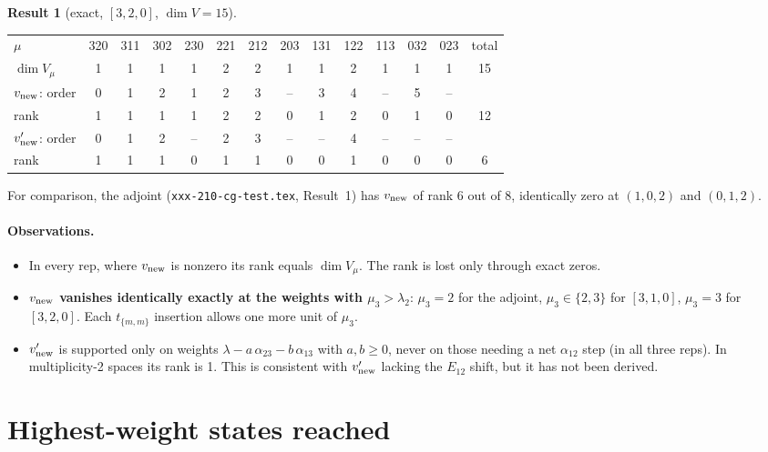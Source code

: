 \documentclass[11pt]{article}
\newcommand{\nb}[1]{\texttt{#1}}
\theoremstyle{definition}
\newtheorem{result}{Result}
\theoremstyle{remark}
\begin{document}
\begin{result}[{exact, $[3,2,0]$, $\dim V=15$}]\label{res:w320}
\begin{center}
\begin{tabular}{lccccccccccccc}\toprule
$\mu$ & 320 & 311 & 302 & 230 & 221 & 212 & 203 & 131 & 122 & 113 & 032 & 023 & total\\
$\dim V_\mu$ & 1 & 1 & 1 & 1 & 2 & 2 & 1 & 1 & 2 & 1 & 1 & 1 & 15\\\midrule
$v_{\rm new}$: order & 0 & 1 & 2 & 1 & 2 & 3 & -- & 3 & 4 & -- & 5 & -- & \\
\phantom{$v_{\rm new}$:} rank & 1 & 1 & 1 & 1 & 2 & 2 & 0 & 1 & 2 & 0 & 1 & 0 & 12\\\midrule
$v'_{\rm new}$: order & 0 & 1 & 2 & -- & 2 & 3 & -- & -- & 4 & -- & -- & -- & \\
\phantom{$v'_{\rm new}$:} rank & 1 & 1 & 1 & 0 & 1 & 1 & 0 & 0 & 1 & 0 & 0 & 0 & 6\\\bottomrule
\end{tabular}
\end{center}
\end{result}

For comparison, the adjoint (\nb{xxx-210-cg-test.tex}, Result~1) has $v_{\rm new}$ of rank 6 out of 8, identically zero at $(1,0,2)$ and $(0,1,2)$.

\paragraph{Observations.}
\begin{itemize}
\item In every rep, where $v_{\rm new}$ is nonzero its rank equals $\dim V_\mu$. The rank is lost only through exact zeros.
\item \textbf{$v_{\rm new}$ vanishes identically exactly at the weights with $\mu_3>\lambda_2$}: $\mu_3=2$ for the adjoint, $\mu_3\in\{2,3\}$ for $[3,1,0]$, $\mu_3=3$ for $[3,2,0]$. Each $t_{\{m,m\}}$ insertion allows one more unit of $\mu_3$.
\item $v'_{\rm new}$ is supported only on weights $\lambda-a\,\alpha_{23}-b\,\alpha_{13}$ with $a,b\ge0$, never on those needing a net $\alpha_{12}$ step (in all three reps). In multiplicity-2 spaces its rank is 1. This is consistent with $v'_{\rm new}$ lacking the $E_{12}$ shift, but it has not been derived.
\end{itemize}

\section{Highest-weight states reached}
\end{document}
